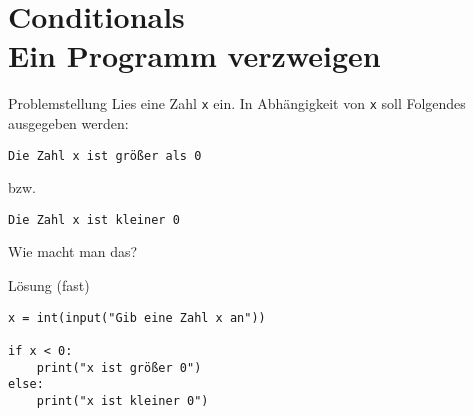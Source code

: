 \documentclass[algorithm,pgfplots,colortheme=dark]{cuzbeamer}
\newcommand{\py}[1]{\texttt{#1}}
\begin{document}

\maketitle






\section{Conditionals \\ \footnotesize Ein Programm verzweigen}

\begin{frame}
	\begin{block}{Problemstellung}
		\vspace{2pt}
		Lies eine Zahl \py{x} ein. In Abhängigkeit von \py{x} soll Folgendes ausgegeben werden: 
		
		\texttt{Die Zahl x ist größer als 0} 
		
		bzw. 
		
		\texttt{Die Zahl x ist kleiner 0}  
		\vspace{8pt}
		
		Wie macht man das?
		\end{block}
\end{frame}

\begin{fragile}
	
\begin{block}{Lösung \footnotesize(fast)}
\begin{verbatim}
x = int(input("Gib eine Zahl x an"))

if x < 0:
	print("x ist größer 0")
else:
	print("x ist kleiner 0")
\end{verbatim}
\end{block}
	
\end{fragile}
\end{document}
